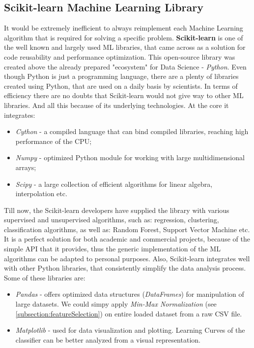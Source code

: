 \subsection{Scikit-learn Machine Learning Library}
It would be extremely inefficient to always reimplement each Machine Learning algorithm that is required for solving a specific problem. \textbf{Scikit-learn} is one of the well known and largely used ML libraries, that came across as a solution for code reusability and performance optimization. This open-source library was created above the already prepared "ecosystem" for Data Science - \textit{Python}. Even though Python is just a programming language, there are a plenty of libraries created using Python, that are used on a daily basis by scientists. In terms of efficiency there are no doubts that Scikit-learn would not give way to other ML libraries. And all this because of its underlying technologies. At the core it integrates:

\begin{itemize}
	\item \textit{Cython} - a compiled language that can bind compiled libraries, reaching high performance of the CPU;
	\item \textit{Numpy} - optimized Python module for working with large multidimensional arrays;
	\item \textit{Scipy} - a large collection of efficient algorithms for linear algebra, interpolation etc.
\end{itemize}

Till now, the Scikit-learn developers have supplied the library with various supervised and unsupervised algorithms, such as: regression, clustering, classification algorithms, as well as: Random Forest, Support Vector Machine etc. It is a perfect solution for both academic and commercial projects, because of the simple API that it provides, thus the generic implementation of the ML algorithms can be adapted to personal purposes. Also, Scikit-learn integrates well with other Python libraries, that consistently simplify the data analysis process. Some of these libraries are: 

\begin{itemize}
	\item \textit{Pandas} - offers optimized data structures (\textit{DataFrames}) for manipulation of large datasets. We could simpy apply \textit{Min-Max Normalization} (see \ref{subsection:featureSelection}) on entire loaded dataset from a raw CSV file.
	\item \textit{Matplotlib} - used for data visualization and plotting. Learning Curves of the classifier can be better analyzed from a visual representation.
\end{itemize}


